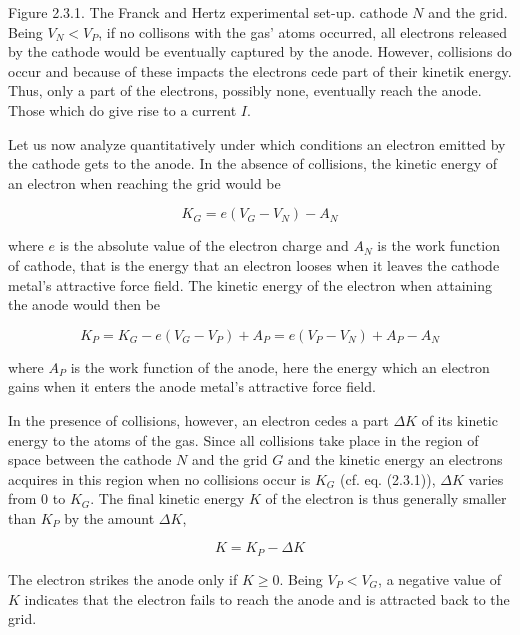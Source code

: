 \documentclass{article}
\begin{document}
Figure 2.3.1. The Franck and Hertz experimental set-up.
cathode $N$ and the grid. Being $V_{N}<V_{P}$, if no collisons with the gas' atoms occurred, all electrons released by the cathode would be eventually captured by the anode. However, collisions do occur and because of these impacts the electrons cede part of their kinetik energy. Thus, only a part of the electrons, possibly none, eventually reach the anode. Those which do give rise to a current $I$.

Let us now analyze quantitatively under which conditions an electron emitted by the cathode gets to the anode. In the absence of collisions, the kinetic energy of an electron when reaching the grid would be
 
\begin{equation*}
K_{G}=e\left(V_{G}-V_{N}\right)-A_{N} \tag{2.3.1}
\end{equation*}
 
where $e$ is the absolute value of the electron charge and $A_{N}$ is the work function of cathode, that is the energy that an electron looses when it leaves the cathode metal's attractive force field. The kinetic energy of the electron when attaining the anode would then be
 
\begin{equation*}
K_{P}=K_{G}-e\left(V_{G}-V_{P}\right)+A_{P}=e\left(V_{P}-V_{N}\right)+A_{P}-A_{N} \tag{2.3.2}
\end{equation*}
 
where $A_{P}$ is the work function of the anode, here the energy which an electron gains when it enters the anode metal's attractive force field.

In the presence of collisions, however, an electron cedes a part $\Delta K$ of its kinetic energy to the atoms of the gas. Since all collisions take place in the region of space between the cathode $N$ and the grid $G$ and the kinetic energy an electrons acquires in this region when no collisions occur is $K_{G}$ (cf. eq. (2.3.1)), $\Delta K$ varies from 0 to $K_{G}$. The final kinetic energy $K$ of the electron is thus generally smaller than $K_{P}$ by the amount $\Delta K$,
 
\begin{equation*}
K=K_{P}-\Delta K \tag{2.3.3}
\end{equation*}
 

The electron strikes the anode only if $K \geq 0$. Being $V_{P}<V_{G}$, a negative value of $K$ indicates that the electron fails to reach the anode and is attracted back to the grid.
\end{document}
